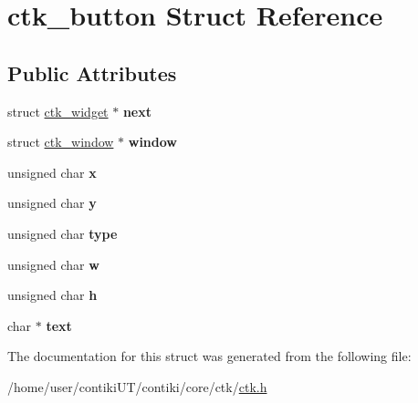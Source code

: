 \hypertarget{structctk__button}{}\section{ctk\+\_\+button Struct Reference}
\label{structctk__button}
\subsection*{Public Attributes}
\begin{DoxyCompactItemize}
\item 
\hypertarget{structctk__button_abffc1d9b638add7d82db1b6ca9a125af}{}struct \hyperlink{structctk__widget}{ctk\+\_\+widget} $\ast$ {\bfseries next}\label{structctk__button_abffc1d9b638add7d82db1b6ca9a125af}

\item 
\hypertarget{structctk__button_a5e8f65bee20463f1b457beb00f950044}{}struct \hyperlink{structctk__window}{ctk\+\_\+window} $\ast$ {\bfseries window}\label{structctk__button_a5e8f65bee20463f1b457beb00f950044}

\item 
\hypertarget{structctk__button_a54bd5860e085739297e5a76591e7d3b0}{}unsigned char {\bfseries x}\label{structctk__button_a54bd5860e085739297e5a76591e7d3b0}

\item 
\hypertarget{structctk__button_ac1acf370a967676b377ebac2c3e97a37}{}unsigned char {\bfseries y}\label{structctk__button_ac1acf370a967676b377ebac2c3e97a37}

\item 
\hypertarget{structctk__button_a00c1f07a09ee93a00fcd2d1ce63dfd51}{}unsigned char {\bfseries type}\label{structctk__button_a00c1f07a09ee93a00fcd2d1ce63dfd51}

\item 
\hypertarget{structctk__button_a8f5e5e49ec895347221efced2b44e420}{}unsigned char {\bfseries w}\label{structctk__button_a8f5e5e49ec895347221efced2b44e420}

\item 
\hypertarget{structctk__button_af13cca1cb0bc76cd9740b4925b3cca74}{}unsigned char {\bfseries h}\label{structctk__button_af13cca1cb0bc76cd9740b4925b3cca74}

\item 
\hypertarget{structctk__button_aed7fbc9499eec9d604be5f4d8f464a30}{}char $\ast$ {\bfseries text}\label{structctk__button_aed7fbc9499eec9d604be5f4d8f464a30}

\end{DoxyCompactItemize}


The documentation for this struct was generated from the following file\+:\begin{DoxyCompactItemize}
\item 
/home/user/contiki\+U\+T/contiki/core/ctk/\hyperlink{ctk_8h}{ctk.\+h}\end{DoxyCompactItemize}
